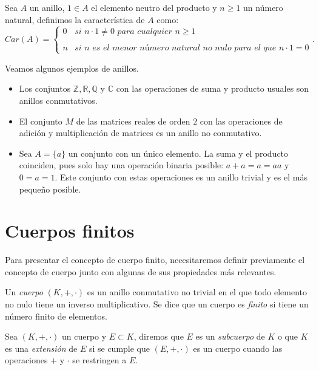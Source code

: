 \begin{definition}
    Sea $A$ un anillo, $1 \in A$ el elemento neutro del producto y $n \geq 1$ un número natural, definimos la característica de $A$ como:
    \[
        Car(A) = \left\{ \begin{array}{lc}
        0 &   \textit{si } n \cdot 1 \neq 0 \textit{ para cualquier } n \geq 1 \\
        \\ n & \textit{si n es el menor número natural no nulo para el que } n \cdot 1 = 0
        \end{array}
        \right. .
    \]
\end{definition}

\begin{exampleth}
    Veamos algunos ejemplos de anillos.
    \begin{itemize}
        \item Los conjuntos $\mathbb{Z}, \mathbb{R}, \mathbb{Q}$ y $\mathbb{C}$ con las operaciones de suma y producto usuales son anillos conmutativos.
        \item El conjunto $M$ de las matrices reales de orden $2$ con las operaciones de adición y multiplicación de matrices es un anillo no conmutativo.
        \item Sea $A = \{ a \}$ un conjunto con un único elemento. La suma y el producto coinciden, pues solo hay una operación binaria posible: $a + a = a = aa$ y $0 = a = 1$. Este conjunto con estas operaciones es un anillo trivial y es el más pequeño posible.
    \end{itemize}
\end{exampleth}

\section{Cuerpos finitos}

Para presentar el concepto de cuerpo finito, necesitaremos definir previamente el concepto de cuerpo junto con algunas de sus propiedades más relevantes.

\begin{definition}
    Un \emph{cuerpo} $(K, +, \cdot)$ es un anillo conmutativo no trivial en el que todo elemento no nulo tiene un inverso multiplicativo. Se dice que un cuerpo es \emph{finito} si tiene un número finito de elementos.
\end{definition}

Sea $(K, +, \cdot)$ un cuerpo y $E \subset K$, diremos que $E$ es un \emph{subcuerpo} de $K$ o que $K$ es una \emph{extensión} de $E$ si se cumple que $(E, +, \cdot)$ es un cuerpo cuando las operaciones $+$ y $\cdot$ se restringen a $E$.

